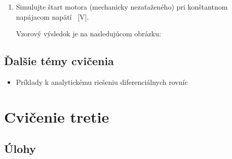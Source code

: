 \documentclass[a4paper, 10pt, ]{article}
\begin{document}
\begin{enumerate}[leftmargin=0pt, labelsep=4mm, itemsep=0pt]
	\item Simulujte štart motora (mechanicky nezaťaženého) pri konštantnom napájacom napätí ~[V].

	Vzorový výsledok je na nasledujúcom obrázku:

	\begin{center}


		\label{Grafické znázornenie výsledku numerickej simulácie}

	\end{center}





\end{enumerate}




\subsection{Ďalšie témy cvičenia}


\begin{itemize}
    \item Príklady k analytickému riešeniu diferenciálnych rovníc
\end{itemize}






























\section{Cvičenie tretie}


\subsection{Úlohy}
\end{document}
